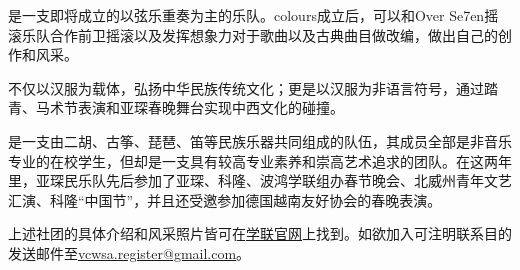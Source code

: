 是一支即将成立的以弦乐重奏为主的乐队。colours成立后，可以和Over Se7en摇滚乐队合作前卫摇滚以及发挥想象力对于歌曲以及古典曲目做改编，做出自己的创作和风采。

不仅以汉服为载体，弘扬中华民族传统文化；更是以汉服为非语言符号，通过踏青、马术节表演和亚琛春晚舞台实现中西文化的碰撞。

是一支由二胡、古筝、琵琶、笛等民族乐器共同组成的队伍，其成员全部是非音乐专业的在校学生，但却是一支具有较高专业素养和崇高艺术追求的团队。在这两年里，亚琛民乐队先后参加了亚琛、科隆、波鸿学联组办春节晚会、北威州青年文艺汇演、科隆“中国节”，并且还受邀参加德国越南友好协会的春晚表演。

上述社团的具体介绍和风采照片皆可在\href{http://www.vcwsa.rwth-aachen.de/category/lives/社团风采/}{学联官网}上找到。如欲加入可注明联系目的发送邮件至\href{mailto:vcwsa.register@gmail.com}{vcwsa.register@gmail.com}。
